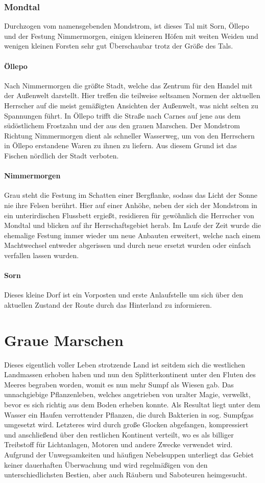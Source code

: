 \documentclass[a4paper,12pt,oneside]{book}
\begin{document}
\subsubsection{Mondtal}
Durchzogen vom namensgebenden Mondstrom, ist dieses Tal mit Sorn, Öllepo und der Festung Nimmermorgen, einigen kleineren Höfen mit weiten Weiden und wenigen kleinen Forsten sehr gut Überschaubar trotz der Größe des Tals.
\paragraph{Öllepo} 
Nach Nimmermorgen die größte Stadt, welche das Zentrum für den Handel mit der Außenwelt darstellt. Hier treffen die teilweise seltsamen Normen der aktuellen Herrscher auf die meist gemäßigten Ansichten der Außenwelt, was nicht selten zu Spannungen führt. In Öllepo trifft die Straße nach Carnes auf jene aus dem südöstlichem Frostzahn und der aus den grauen Marschen. Der Mondstrom Richtung Nimmermorgen dient als schneller Wasserweg, um von den Herrschern in Öllepo erstandene Waren zu ihnen zu liefern. Aus diesem Grund ist das Fischen nördlich der Stadt verboten.%
\paragraph{Nimmermorgen}
Grau steht die Festung im Schatten einer Bergflanke, sodass das Licht der Sonne nie ihre Felsen berührt. Hier auf einer Anhöhe, neben der sich der Mondstrom in ein unterirdischen Flussbett ergießt, residieren für gewöhnlich die Herrscher von Mondtal und blicken auf ihr Herrschaftsgebiet herab. Im Laufe der Zeit wurde die ehemalige Festung immer wieder um neue Anbauten erweitert, welche nach einem Machtwechsel entweder abgerissen und durch neue ersetzt wurden oder einfach verfallen lassen wurden. 
\paragraph{Sorn}
Dieses kleine Dorf ist ein Vorposten und erste Anlaufstelle um sich über den aktuellen Zustand der Route durch das Hinterland zu informieren. 
\section{Graue Marschen}
Dieses eigentlich voller Leben strotzende Land ist seitdem sich die westlichen Landmassen erhoben haben und nun den Splitterkontinent unter den Fluten des Meeres begraben worden, womit es nun mehr Sumpf als Wiesen gab. Das unnachgiebige Pflanzenleben, welches angetrieben von uralter Magie, verwelkt, bevor es sich richtig aus dem Boden erheben konnte. Als Resultat liegt unter dem Wasser ein Haufen verrottender Pflanzen, die durch Bakterien in sog. Sumpfgas umgesetzt wird. Letzteres wird durch große Glocken abgefangen, kompressiert und anschließend über den restlichen Kontinent verteilt, wo es als billiger Treibstoff für Lichtanlagen, Motoren und andere Zwecke verwendet wird. Aufgrund der Unwegsamkeiten und häufigen Nebelsuppen unterliegt das Gebiet keiner dauerhaften Überwachung und wird regelmäßigen von den unterschiedlichsten Bestien, aber auch Räubern und Saboteuren heimgesucht.
\end{document}
